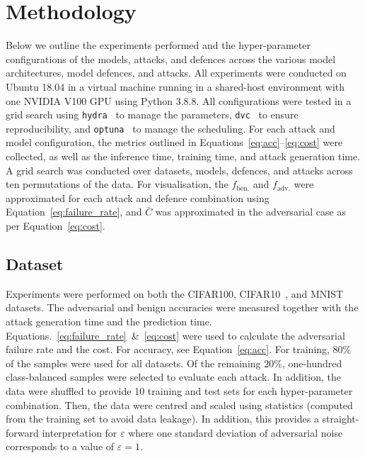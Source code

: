 \section{Methodology}
\label{methods}
Below we outline the experiments performed and the hyper-parameter configurations of the models, attacks, and defences across the various model architectures, model defences, and attacks. All experiments were conducted on Ubuntu 18.04 in a virtual machine running in a shared-host environment with one NVIDIA V100 GPU using Python 3.8.8. All configurations were tested in a grid search using \texttt{hydra}~\cite{hydra} to manage the parameters, \texttt{dvc}~\cite{dvc} to ensure reproducibility, and \texttt{optuna}~\cite{optuna} to manage the scheduling. For each attack and model configuration, the metrics outlined in Equations~\ref{eq:acc}--\ref{eq:cost} were collected, as well as the inference time, training time, and attack generation time. A grid search was conducted over datasets, models, defences, and attacks across ten permutations of the data. For visualisation, the $f_{\mathrm{ben.}}$ and $f_{\mathrm{adv.}}$ were approximated for each attack and defence combination using Equation~\ref{eq:failure_rate}, and $\bar{C}$ was approximated in the adversarial case as per Equation~\ref{eq:cost}.



\subsection{Dataset}
\label{dataset}

Experiments were performed on both the CIFAR100, CIFAR10~\cite{cifar}, and MNIST~\cite{mnist} datasets. The adversarial and benign accuracies were measured together with the attack generation time and the prediction time. Equations.~\ref{eq:failure_rate}~\&~\ref{eq:cost} were used to calculate the adversarial failure rate and the cost. For accuracy, see Equation~\ref{eq:acc}. For training, 80\% of the samples were used for all datasets. Of the remaining 20\%, one-hundred class-balanced samples were selected to evaluate each attack. In addition, the data were shuffled to provide 10 training and test sets for each hyper-parameter combination. Then, the data were centred and scaled using statistics (computed from the training set to avoid data leakage). In addition, this provides a straight-forward interpretation for $\varepsilon$ where one standard deviation of adversarial noise corresponds to a value of $\varepsilon = 1$.


